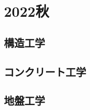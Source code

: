 \newpage
\section{2022秋}
\setcounter{yearcounter}{2022}

\subsection{構造工学}
\subsection{コンクリート工学}
\subsection{地盤工学}
